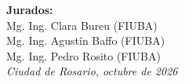 \begin{titlepage}
\begin{flushright}
        {\fontsize{11pt}{15pt}\selectfont
            \textbf{Jurados:}} \\[0.5cm]
        {\fontsize{11pt}{15pt}\selectfont
            Mg. Ing. Clara Bureu (FIUBA)} \\
        {\fontsize{11pt}{15pt}\selectfont
            Mg. Ing. Agustín Baffo (FIUBA)} \\
        {\fontsize{11pt}{15pt}\selectfont
            Mg. Ing. Pedro Rosito (FIUBA)} \\[2cm]

        {\itshape\fontsize{10pt}{12pt}\selectfont
            Ciudad de Rosario, octubre de 2026} %
    \end{flushright}
\end{titlepage}
